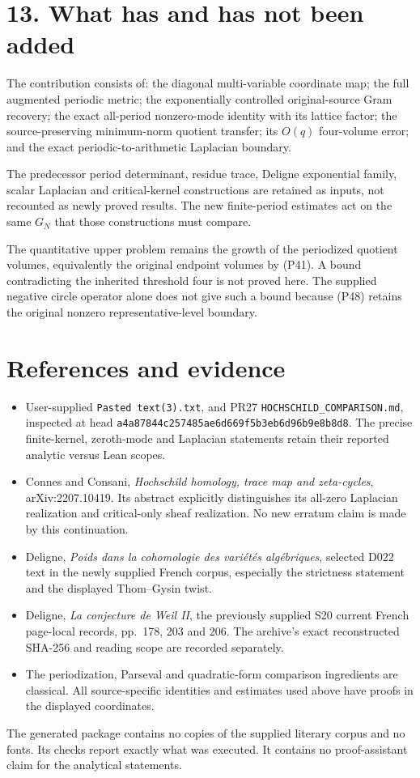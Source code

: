 \documentclass[
]{article}
\providecommand{\tightlist}{%
  \setlength{\itemsep}{0pt}\setlength{\parskip}{0pt}}
\begin{document}
\section{13. What has and has not been
added}\label{what-has-and-has-not-been-added}

The contribution consists of: the diagonal multi-variable coordinate
map; the full augmented periodic metric; the exponentially controlled
original-source Gram recovery; the exact all-period nonzero-mode
identity with its lattice factor; the source-preserving minimum-norm
quotient transfer; its \(O(q)\) four-volume error; and the exact
periodic-to-arithmetic Laplacian boundary.

The predecessor period determinant, residue trace, Deligne exponential
family, scalar Laplacian and critical-kernel constructions are retained
as inputs, not recounted as newly proved results. The new finite-period
estimates act on the same \(G_N\) that those constructions must compare.

The quantitative upper problem remains the growth of the periodized
quotient volumes, equivalently the original endpoint volumes by (P41). A
bound contradicting the inherited threshold four is not proved here. The
supplied negative circle operator alone does not give such a bound
because (P48) retains the original nonzero representative-level
boundary.

\section{References and evidence}\label{references-and-evidence}

\begin{itemize}
\tightlist
\item
  User-supplied \texttt{Pasted\ text(3).txt}, and PR27
  \texttt{HOCHSCHILD\_COMPARISON.md}, inspected at head
  \texttt{a4a87844c257485ae6d669f5b3eb6d96b9e8b8d8}. The precise
  finite-kernel, zeroth-mode and Laplacian statements retain their
  reported analytic versus Lean scopes.
\item
  Connes and Consani, \emph{Hochschild homology, trace map and
  zeta-cycles}, arXiv:2207.10419. Its abstract explicitly distinguishes
  its all-zero Laplacian realization and critical-only sheaf
  realization. No new erratum claim is made by this continuation.
\item
  Deligne, \emph{Poids dans la cohomologie des variétés algébriques},
  selected D022 text in the newly supplied French corpus, especially the
  strictness statement and the displayed Thom--Gysin twist.
\item
  Deligne, \emph{La conjecture de Weil II}, the previously supplied S20
  current French page-local records, pp.~178, 203 and 206. The archive's
  exact reconstructed SHA-256 and reading scope are recorded separately.
\item
  The periodization, Parseval and quadratic-form comparison ingredients
  are classical. All source-specific identities and estimates used above
  have proofs in the displayed coordinates.
\end{itemize}

The generated package contains no copies of the supplied literary corpus
and no fonts. Its checks report exactly what was executed. It contains
no proof-assistant claim for the analytical statements.
\end{document}
